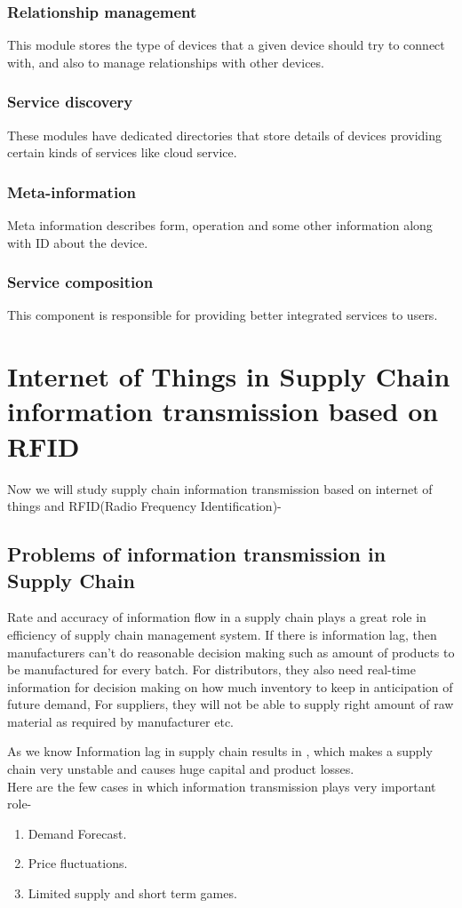 \documentclass[12pt, a4paper]{report}
\begin{document}
\subsection{Relationship management}
This module stores the type of devices that a given device should try to connect with, and also to manage relationships with other devices.
\subsection{Service discovery}
These modules have dedicated directories that store details of devices providing certain kinds of services like cloud service.
\subsection{Meta-information}
Meta information describes form, operation and some other information along with ID about the device.
\subsection{Service composition}
This component is responsible for providing better integrated services to users. 


\chapter{Internet of Things in Supply Chain information transmission based on RFID}
Now we will study supply chain information transmission based on internet of things and RFID(Radio Frequency Identification)-


\section{Problems of information transmission in Supply Chain}
Rate and accuracy of information flow in a supply chain plays a great role in efficiency of supply chain management system. If there is information lag, then manufacturers can't do reasonable decision making such as amount of products to be manufactured for every batch. For distributors, they also need real-time information for decision making on how much inventory to keep in anticipation of future demand, For suppliers, they will not be able to supply right amount of raw material as required by manufacturer etc. \par
As we know Information lag in supply chain results in , which makes a supply chain very unstable and causes huge capital and product losses.\\
Here are the few cases in which information transmission plays very important role-
\begin{enumerate}
	\item Demand Forecast.
    \item Price fluctuations.
    \item Limited supply and short term games.
\end{enumerate}
\end{document}
